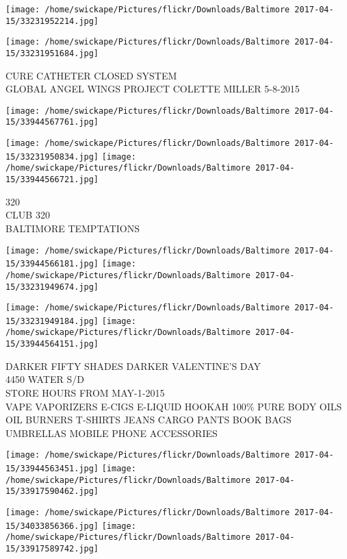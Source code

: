 \documentclass[10pt,letterpaper]{article}
\begin{document}
\texttt{[image: /home/swickape/Pictures/flickr/Downloads/Baltimore 2017-04-15/33231952214.jpg]}

\vspace{0.25in}
\texttt{[image: /home/swickape/Pictures/flickr/Downloads/Baltimore 2017-04-15/33231951684.jpg]}

CURE CATHETER CLOSED SYSTEM\\
GLOBAL ANGEL WINGS PROJECT COLETTE MILLER 5{-}8{-}2015\\
\pagebreak

\texttt{[image: /home/swickape/Pictures/flickr/Downloads/Baltimore 2017-04-15/33944567761.jpg]}

\vspace{0.25in}
\texttt{[image: /home/swickape/Pictures/flickr/Downloads/Baltimore 2017-04-15/33231950834.jpg]}
\texttt{[image: /home/swickape/Pictures/flickr/Downloads/Baltimore 2017-04-15/33944566721.jpg]}

320\\
CLUB 320\\
BALTIMORE TEMPTATIONS\\
\pagebreak

\texttt{[image: /home/swickape/Pictures/flickr/Downloads/Baltimore 2017-04-15/33944566181.jpg]}
\texttt{[image: /home/swickape/Pictures/flickr/Downloads/Baltimore 2017-04-15/33231949674.jpg]}

\texttt{[image: /home/swickape/Pictures/flickr/Downloads/Baltimore 2017-04-15/33231949184.jpg]}
\texttt{[image: /home/swickape/Pictures/flickr/Downloads/Baltimore 2017-04-15/33944564151.jpg]}

DARKER FIFTY SHADES DARKER VALENTINE'S DAY\\
4450 WATER S/D\\
STORE HOURS FROM MAY{-}1{-}2015\\
VAPE VAPORIZERS E{-}CIGS E{-}LIQUID HOOKAH 100\% PURE BODY OILS OIL BURNERS T{-}SHIRTS JEANS CARGO PANTS BOOK BAGS UMBRELLAS MOBILE PHONE ACCESSORIES\\
\pagebreak

\texttt{[image: /home/swickape/Pictures/flickr/Downloads/Baltimore 2017-04-15/33944563451.jpg]}
\texttt{[image: /home/swickape/Pictures/flickr/Downloads/Baltimore 2017-04-15/33917590462.jpg]}

\texttt{[image: /home/swickape/Pictures/flickr/Downloads/Baltimore 2017-04-15/34033856366.jpg]}
\texttt{[image: /home/swickape/Pictures/flickr/Downloads/Baltimore 2017-04-15/33917589742.jpg]}
\end{document}
